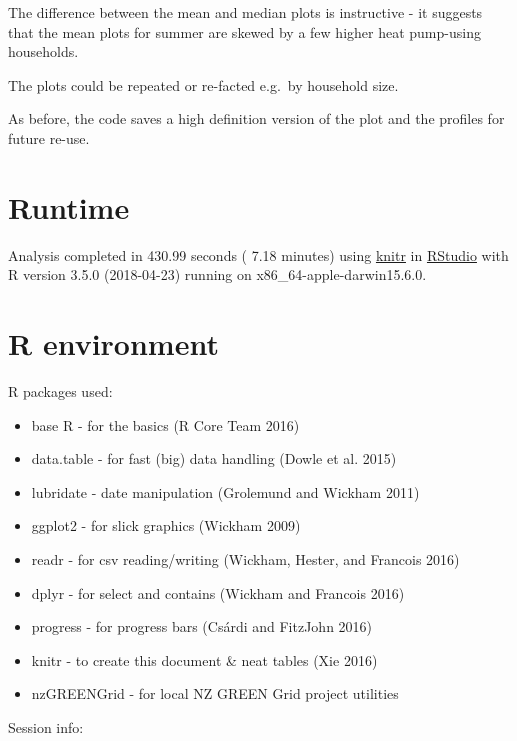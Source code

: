 \documentclass[]{article}
\providecommand{\tightlist}{%
  \setlength{\itemsep}{0pt}\setlength{\parskip}{0pt}}
\begin{document}
The difference between the mean and median plots is instructive - it
suggests that the mean plots for summer are skewed by a few higher heat
pump-using households.

The plots could be repeated or re-facted e.g.~by household size.

As before, the code saves a high definition version of the plot and the
profiles for future re-use.

\section{Runtime}\label{runtime}

Analysis completed in 430.99 seconds ( 7.18 minutes) using
\href{https://cran.r-project.org/package=knitr}{knitr} in
\href{http://www.rstudio.com}{RStudio} with R version 3.5.0 (2018-04-23)
running on x86\_64-apple-darwin15.6.0.

\section{R environment}\label{r-environment}

R packages used:

\begin{itemize}
\tightlist
\item
  base R - for the basics (R Core Team 2016)
\item
  data.table - for fast (big) data handling (Dowle et al. 2015)
\item
  lubridate - date manipulation (Grolemund and Wickham 2011)
\item
  ggplot2 - for slick graphics (Wickham 2009)
\item
  readr - for csv reading/writing (Wickham, Hester, and Francois 2016)
\item
  dplyr - for select and contains (Wickham and Francois 2016)
\item
  progress - for progress bars (Csárdi and FitzJohn 2016)
\item
  knitr - to create this document \& neat tables (Xie 2016)
\item
  nzGREENGrid - for local NZ GREEN Grid project utilities
\end{itemize}

Session info:
\end{document}
